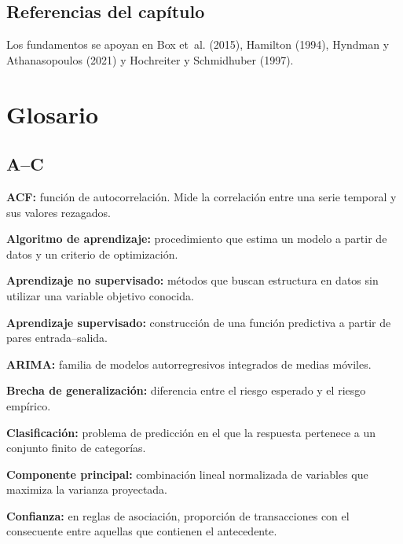 \documentclass[
  spanish,
  10.5pt,
  letterpaper,
  DIV=11,
  numbers=noendperiod,
  oneside,
  open=any]{scrreprt}
\theoremstyle{definition}
\theoremstyle{definition}
\theoremstyle{plain}
\theoremstyle{remark}
\begin{document}
\section*{Referencias del
capítulo}\label{referencias-del-capuxedtulo-21}


Los fundamentos se apoyan en Box et~al. (2015), Hamilton (1994), Hyndman
y Athanasopoulos (2021) y Hochreiter y Schmidhuber (1997).


\chapter*{Glosario}\label{glosario}


\section*{A--C}\label{ac}


\textbf{ACF:} función de autocorrelación. Mide la correlación entre una
serie temporal y sus valores rezagados.

\textbf{Algoritmo de aprendizaje:} procedimiento que estima un modelo a
partir de datos y un criterio de optimización.

\textbf{Aprendizaje no supervisado:} métodos que buscan estructura en
datos sin utilizar una variable objetivo conocida.

\textbf{Aprendizaje supervisado:} construcción de una función predictiva
a partir de pares entrada--salida.

\textbf{ARIMA:} familia de modelos autorregresivos integrados de medias
móviles.

\textbf{Brecha de generalización:} diferencia entre el riesgo esperado y
el riesgo empírico.

\textbf{Clasificación:} problema de predicción en el que la respuesta
pertenece a un conjunto finito de categorías.

\textbf{Componente principal:} combinación lineal normalizada de
variables que maximiza la varianza proyectada.

\textbf{Confianza:} en reglas de asociación, proporción de transacciones
con el consecuente entre aquellas que contienen el antecedente.
\end{document}
